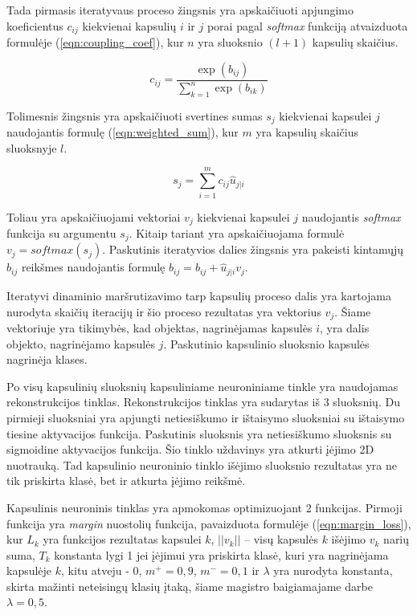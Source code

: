Tada pirmasis iteratyvaus proceso žingsnis yra apskaičiuoti apjungimo koeficientus $c_{ij}$ kiekvienai kapsulių $i$ ir $j$ porai pagal \textit{softmax} funkciją atvaizduota formulėje (\ref{eqn:coupling_coef}), kur $n$ yra sluoksnio $(l + 1)$ kapsulių skaičius.

\begin{equation}
\label{eqn:coupling_coef}
	c_{ij} = \dfrac{\exp(b_{ij})}{\sum_{k = 1}^{n} \exp(b_{ik})}
\end{equation}

Tolimesnis žingsnis yra apskaičiuoti svertines sumas $s_j$ kiekvienai kapsulei $j$ naudojantis formulę (\ref{eqn:weighted_sum}), kur $m$ yra kapsulių skaičius sluoksnyje $l$.

\begin{equation}
\label{eqn:weighted_sum}
	s_{j} = \sum_{i = 1}^{m} c_{ij} \hat{u}_{j|i}
\end{equation}

Toliau yra apskaičiuojami vektoriai $v_j$ kiekvienai kapsulei $j$ naudojantis \textit{softmax} funkcija su argumentu $s_j$. Kitaip tariant yra apskaičiuojama formulė $v_j = softmax(s_j)$. Paskutinis iteratyvios dalies žingsnis yra pakeisti kintamųjų $b_{ij}$ reikšmes naudojantis formulę $b_{ij} = b_{ij} + \hat{u}_{j|i} v_j$.

Iteratyvi dinaminio maršrutizavimo tarp kapsulių proceso dalis yra kartojama nurodyta skaičių iteracijų ir šio proceso rezultatas yra vektorius $v_j$. Šiame vektoriuje yra tikimybės, kad objektas, nagrinėjamas kapsulės $i$, yra dalis objekto, nagrinėjamo kapsulės $j$. Paskutinio kapsulinio sluoksnio kapsulės nagrinėja klases.

Po visų kapsulinių sluoksnių kapsuliniame neuroniniame tinkle yra naudojamas rekonstrukcijos tinklas. Rekonstrukcijos tinklas yra sudarytas iš 3 sluoksnių. Du pirmieji sluoksniai yra apjungti netiesiškumo ir ištaisymo sluoksniai su ištaisymo tiesine aktyvacijos funkcija. Paskutinis sluoksnis yra netiesiškumo sluoksnis su sigmoidine aktyvacijos funkcija. Šio tinklo uždavinys yra atkurti įėjimo 2D nuotrauką. Tad kapsulinio neuroninio tinklo išėjimo sluoksnio rezultatas yra ne tik priskirta klasė, bet ir atkurta įėjimo reikšmė.

Kapsulinis neuroninis tinklas yra apmokomas optimizuojant 2 funkcijas. Pirmoji funkcija yra \textit{margin} nuostolių funkcija, pavaizduota formulėje (\ref{eqn:margin_loss}), kur $L_k$ yra funkcijos rezultatas kapsulei $k$, $||v_k||$ -- visų kapsulės $k$ išėjimo $v_k$ narių suma, $T_k$ konstanta lygi 1 jei įėjimui yra priskirta klasė, kuri yra nagrinėjama kapsulėje $k$, kitu atveju - 0, $m^+ = 0,9$, $m^- = 0,1$ ir $\lambda$ yra nurodyta konstanta, skirta mažinti neteisingų klasių įtaką, šiame magistro baigiamajame darbe $\lambda = 0,5$.

